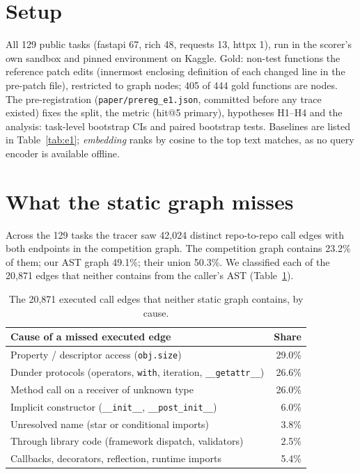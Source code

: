 \documentclass[10pt]{article}
\newcommand{\code}[1]{\texttt{#1}}
\begin{document}
\section{Setup}

All 129 public tasks (fastapi 67, rich 48, requests 13, httpx 1), run in the scorer's own sandbox and pinned environment
on Kaggle. Gold: non-test functions the reference patch edits (innermost enclosing definition of each changed line in
the pre-patch file), restricted to graph nodes; 405 of 444 gold functions are nodes. The pre-registration
(\code{paper/prereg\_e1.json}, committed before any trace existed) fixes the split, the metric (hit@5 primary),
hypotheses H1--H4 and the analysis: task-level bootstrap CIs and paired bootstrap tests. Baselines are listed in
Table~\ref{tab:e1}; \emph{embedding} ranks by cosine to the top text matches, as no query encoder is available offline.

\section{What the static graph misses}
\label{sec:d1}

Across the 129 tasks the tracer saw 42{,}024 distinct repo-to-repo call edges with both endpoints in the competition
graph. The competition graph contains 23.2\% of them; our AST graph 49.1\%; their union 50.3\%. We classified each of
the 20{,}871 edges that neither contains from the caller's AST (Table~\ref{tab:d1}).

\begin{table}[h]
\centering\small
\begin{tabular}{lr}
\toprule
Cause of a missed executed edge & Share \\
\midrule
Property / descriptor access (\code{obj.size}) & 29.0\% \\
Dunder protocols (operators, \code{with}, iteration, \code{\_\_getattr\_\_}) & 26.6\% \\
Method call on a receiver of unknown type & 26.0\% \\
Implicit constructor (\code{\_\_init\_\_}, \code{\_\_post\_init\_\_}) & 6.0\% \\
Unresolved name (star or conditional imports) & 3.8\% \\
Through library code (framework dispatch, validators) & 2.5\% \\
Callbacks, decorators, reflection, runtime imports & 5.4\% \\
\bottomrule
\end{tabular}
\caption{The 20{,}871 executed call edges that neither static graph contains, by cause.}
\label{tab:d1}
\end{table}
\end{document}
